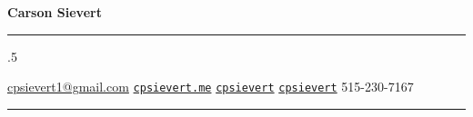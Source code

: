 \centerline{\huge \bf Carson Sievert}

\vspace{2 mm}

\hrule

\vspace{2 mm}


\moveleft.5\hoffset\centerline{
\faEnvelope \hspace{0.5 mm} \href{mailto:cpsievert1@gmail.com}{cpsievert1@gmail.com}  \hspace{1 mm} \faGlobe  \hspace{0.5 mm} \href{https://cpsievert.me}{\tt cpsievert.me} \hspace{1 mm} \faTwitter \hspace{0.5 mm} \href{https://twitter.com/cpsievert}{\tt cpsievert} \hspace{1 mm} \faGithub  \hspace{0.5 mm} \href{https://github.com/cpsievert}{\tt cpsievert}  \hspace{1 mm} \faPhone  \hspace{0.5 mm} 515-230-7167
}
\vspace{2 mm}

\hrule